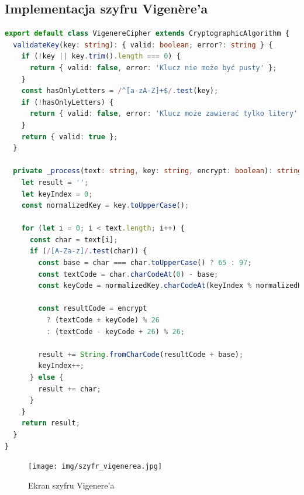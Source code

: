 \documentclass[12pt,a4paper]{article}
\begin{document}
\newpage
\subsection{Implementacja szyfru Vigenère'a}
\begin{lstlisting}[language=TypeScript, caption={Fragmenty klasy VigenereCipher}]
export default class VigenereCipher extends CryptographicAlgorithm {
  validateKey(key: string): { valid: boolean; error?: string } {
    if (!key || key.trim().length === 0) {
      return { valid: false, error: 'Klucz nie może być pusty' };
    }
    const hasOnlyLetters = /^[a-zA-Z]+$/.test(key);
    if (!hasOnlyLetters) {
      return { valid: false, error: 'Klucz może zawierać tylko litery' };
    }
    return { valid: true };
  }

  private _process(text: string, key: string, encrypt: boolean): string {
    let result = '';
    let keyIndex = 0;
    const normalizedKey = key.toUpperCase();
    
    for (let i = 0; i < text.length; i++) {
      const char = text[i];
      if (/[A-Za-z]/.test(char)) {
        const base = char === char.toUpperCase() ? 65 : 97;
        const textCode = char.charCodeAt(0) - base;
        const keyCode = normalizedKey.charCodeAt(keyIndex % normalizedKey.length) - 65;
        
        const resultCode = encrypt 
          ? (textCode + keyCode) % 26 
          : (textCode - keyCode + 26) % 26;
        
        result += String.fromCharCode(resultCode + base);
        keyIndex++;
      } else {
        result += char;
      }
    }
    return result;
  }
}
\end{lstlisting}

\newpage
\begin{figure}[H]
    \centering
    \texttt{[image: img/szyfr\_vigenerea.jpg]}
    \caption{Ekran szyfru Vigenere'a}
\end{figure}
\end{document}

